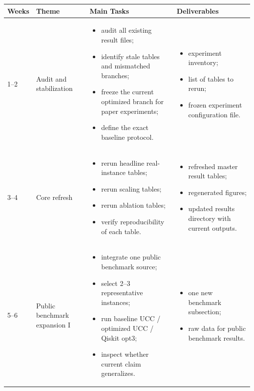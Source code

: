 \documentclass[11pt]{article}
\begin{document}
\begin{longtable}{p{} p{} p{} p{}}
\toprule
\textbf{Weeks} & \textbf{Theme} & \textbf{Main Tasks} & \textbf{Deliverables} \\
\midrule
\endhead

1--2 &
Audit and stabilization &
\begin{itemize}
    \item audit all existing result files;
    \item identify stale tables and mismatched branches;
    \item freeze the current optimized branch for paper experiments;
    \item define the exact baseline protocol.
\end{itemize}
&
\begin{itemize}
    \item experiment inventory;
    \item list of tables to rerun;
    \item frozen experiment configuration file.
\end{itemize}
\\

3--4 &
Core refresh &
\begin{itemize}
    \item rerun headline real-instance tables;
    \item rerun scaling tables;
    \item rerun ablation tables;
    \item verify reproducibility of each table.
\end{itemize}
&
\begin{itemize}
    \item refreshed master result tables;
    \item regenerated figures;
    \item updated results directory with current outputs.
\end{itemize}
\\

5--6 &
Public benchmark expansion I &
\begin{itemize}
    \item integrate one public benchmark source;
    \item select 2--3 representative instances;
    \item run baseline UCC / optimized UCC / Qiskit opt3;
    \item inspect whether current claim generalizes.
\end{itemize}
&
\begin{itemize}
    \item one new benchmark subsection;
    \item raw data for public benchmark results.
\end{itemize}
\\


\end{longtable}
\end{document}
